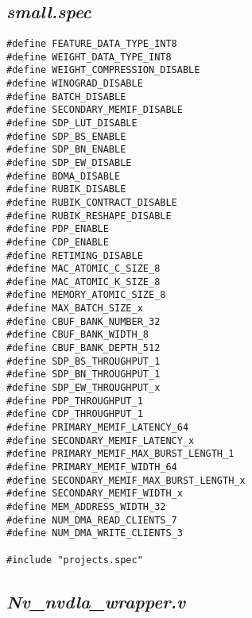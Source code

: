 \chapter{}

\section{\emph{small.spec}}

\lstset{language=C++}
\begin{lstlisting}
#define FEATURE_DATA_TYPE_INT8
#define WEIGHT_DATA_TYPE_INT8
#define WEIGHT_COMPRESSION_DISABLE
#define WINOGRAD_DISABLE 
#define BATCH_DISABLE
#define SECONDARY_MEMIF_DISABLE
#define SDP_LUT_DISABLE
#define SDP_BS_ENABLE
#define SDP_BN_ENABLE
#define SDP_EW_DISABLE
#define BDMA_DISABLE
#define RUBIK_DISABLE
#define RUBIK_CONTRACT_DISABLE
#define RUBIK_RESHAPE_DISABLE
#define PDP_ENABLE
#define CDP_ENABLE
#define RETIMING_DISABLE
#define MAC_ATOMIC_C_SIZE_8
#define MAC_ATOMIC_K_SIZE_8
#define MEMORY_ATOMIC_SIZE_8
#define MAX_BATCH_SIZE_x
#define CBUF_BANK_NUMBER_32
#define CBUF_BANK_WIDTH_8
#define CBUF_BANK_DEPTH_512
#define SDP_BS_THROUGHPUT_1
#define SDP_BN_THROUGHPUT_1
#define SDP_EW_THROUGHPUT_x
#define PDP_THROUGHPUT_1
#define CDP_THROUGHPUT_1
#define PRIMARY_MEMIF_LATENCY_64
#define SECONDARY_MEMIF_LATENCY_x
#define PRIMARY_MEMIF_MAX_BURST_LENGTH_1
#define PRIMARY_MEMIF_WIDTH_64
#define SECONDARY_MEMIF_MAX_BURST_LENGTH_x
#define SECONDARY_MEMIF_WIDTH_x
#define MEM_ADDRESS_WIDTH_32
#define NUM_DMA_READ_CLIENTS_7
#define NUM_DMA_WRITE_CLIENTS_3

#include "projects.spec"

\end{lstlisting}


\section{\emph{Nv\_nvdla\_wrapper.v}}

